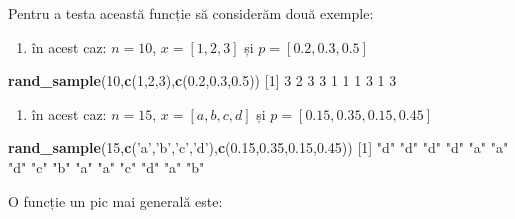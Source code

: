 \documentclass[]{article}
\newenvironment{Shaded}{\begin{snugshade}}{\end{snugshade}}
\newcommand{\KeywordTok}[1]{\textcolor[rgb]{0.13,0.29,0.53}{\textbf{#1}}}
\newcommand{\DecValTok}[1]{\textcolor[rgb]{0.00,0.00,0.81}{#1}}
\newcommand{\FloatTok}[1]{\textcolor[rgb]{0.00,0.00,0.81}{#1}}
\newcommand{\StringTok}[1]{\textcolor[rgb]{0.31,0.60,0.02}{#1}}
\newcommand{\NormalTok}[1]{#1}
\providecommand{\tightlist}{%
  \setlength{\itemsep}{0pt}\setlength{\parskip}{0pt}}
\begin{document}
Pentru a testa această funcție să considerăm două exemple:

\begin{enumerate}
\def\labelenumi{\arabic{enumi}.}
\tightlist
\item
  în acest caz: \(n=10\), \(x=[1,2,3]\) și \(p=[0.2,0.3,0.5]\)
\end{enumerate}

\begin{Shaded}
\begin{Highlighting}[]
\KeywordTok{rand_sample}\NormalTok{(}\DecValTok{10}\NormalTok{,}\KeywordTok{c}\NormalTok{(}\DecValTok{1}\NormalTok{,}\DecValTok{2}\NormalTok{,}\DecValTok{3}\NormalTok{),}\KeywordTok{c}\NormalTok{(}\FloatTok{0.2}\NormalTok{,}\FloatTok{0.3}\NormalTok{,}\FloatTok{0.5}\NormalTok{))}
\NormalTok{ [}\DecValTok{1}\NormalTok{] }\DecValTok{3} \DecValTok{2} \DecValTok{3} \DecValTok{3} \DecValTok{1} \DecValTok{1} \DecValTok{1} \DecValTok{3} \DecValTok{1} \DecValTok{3}
\end{Highlighting}
\end{Shaded}

\begin{enumerate}
\def\labelenumi{\arabic{enumi}.}
\setcounter{enumi}{1}
\tightlist
\item
  în acest caz: \(n=15\), \(x=[a,b,c,d]\) și \(p=[0.15,0.35,0.15,0.45]\)
\end{enumerate}

\begin{Shaded}
\begin{Highlighting}[]
\KeywordTok{rand_sample}\NormalTok{(}\DecValTok{15}\NormalTok{,}\KeywordTok{c}\NormalTok{(}\StringTok{'a'}\NormalTok{,}\StringTok{'b'}\NormalTok{,}\StringTok{'c'}\NormalTok{,}\StringTok{'d'}\NormalTok{),}\KeywordTok{c}\NormalTok{(}\FloatTok{0.15}\NormalTok{,}\FloatTok{0.35}\NormalTok{,}\FloatTok{0.15}\NormalTok{,}\FloatTok{0.45}\NormalTok{))}
\NormalTok{ [}\DecValTok{1}\NormalTok{] }\StringTok{"d"} \StringTok{"d"} \StringTok{"d"} \StringTok{"d"} \StringTok{"a"} \StringTok{"a"} \StringTok{"d"} \StringTok{"c"} \StringTok{"b"} \StringTok{"a"} \StringTok{"a"} \StringTok{"c"} \StringTok{"d"} \StringTok{"a"} \StringTok{"b"}
\end{Highlighting}
\end{Shaded}

O funcție un pic mai generală este:
\end{document}
